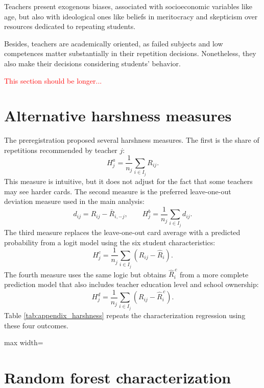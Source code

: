 \documentclass[12pt,a4paper]{article}
\newcommand{\tabpath}{../3. Output/tables/}
\begin{document}
Teachers present exogenous biases, associated with socioeconomic variables like age, but also with ideological ones like beliefs in meritocracy and skepticism over resources dedicated to repeating students. 

Besides, teachers are academically oriented, as failed subjects and low competences matter substantially in their repetition decisions. Nonetheless, they also make their decisions considering students' behavior. 

\textcolor{red}{This section should be longer...}

\clearpage
\appendix

\section{Alternative harshness measures}\label{app:measures}


The preregistration proposed several harshness measures. The first is the share of repetitions recommended by teacher \(j\):
\[
H^a_j=\frac{1}{n_j}\sum_{i\in I_j} R_{ij}.
\]
This measure is intuitive, but it does not adjust for the fact that some teachers may see harder cards. The second measure is the preferred leave-one-out deviation measure used in the main analysis:
\[
d_{ij}=R_{ij}-\bar{R}_{i,-j}, \qquad H^b_j=\frac{1}{n_j}\sum_{i\in I_j}d_{ij}.
\]
The third measure replaces the leave-one-out card average with a predicted probability from a logit model using the six student characteristics:
\[
H^c_j=\frac{1}{n_j}\sum_{i\in I_j}(R_{ij}-\widehat{R}_i).
\]
The fourth measure uses the same logic but obtains \(\widehat{R}^{\,c}_i\) from a more complete prediction model that also includes teacher education level and school ownership:
\[
H^d_j=\frac{1}{n_j}\sum_{i\in I_j}(R_{ij}-\widehat{R}^{\,c}_i).
\]
Table \ref{tab:appendix_harshness} repeats the characterization regression using these four outcomes.

\begin{table}[H]
\centering
\caption{Teacher characterization using alternative harshness measures}
\label{tab:appendix_harshness}
\begin{adjustbox}{max width=\textwidth}

\end{adjustbox}
\end{table}

\section{Random forest characterization}\label{app:rf}
\end{document}
